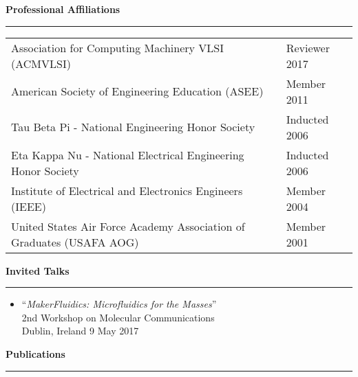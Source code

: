 \large
\textbf{Professional Affiliations}\\
\rule{\textwidth}{1pt}

\begin{table}[h!]
\centering
\small
\begin{tabular}{ p{12.5cm} p{4.5cm}}
	Association for Computing Machinery VLSI (ACMVLSI) & Reviewer 2017 \\
	American Society of Engineering Education (ASEE) & Member 2011 \\
	Tau Beta Pi - National Engineering Honor Society & Inducted 2006\\
	Eta Kappa Nu - National Electrical Engineering Honor Society & Inducted 2006\\
	Institute of Electrical and Electronics Engineers (IEEE) & Member 2004 \\
	United States Air Force Academy Association of Graduates (USAFA AOG) & Member 2001
\end{tabular}
\end{table}

\large
\textbf{Invited Talks}\\
\rule{\textwidth}{1pt}

\small
\begin{itemize}
	\item ``\textit{MakerFluidics: Microfluidics for the Masses}'' \\2nd Workshop on Molecular Communications\\Dublin, Ireland 9 May 2017
\end{itemize}

\large
\textbf{Publications}\\
\rule{\textwidth}{1pt}

